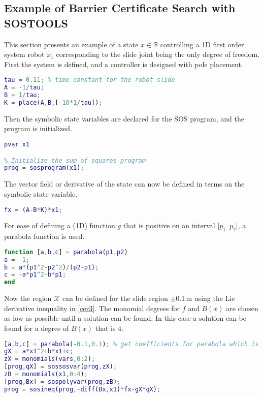 \subsection{Example of Barrier Certificate Search with SOSTOOLS}
This section presents an example of a state $x\in\mathbb{R}$ controlling a 1D first order system robot $x_1$ corresponding to the slide joint being the only degree of freedom. First the system is defined, and a controller is designed with pole placement.
\begin{lstlisting}[language=matlab]
% Define state-space system with x1 = robot position
tau = 0.11; % time constant for the robot slide
A = -1/tau;
B = 1/tau;
K = place(A,B,[-10*1/tau]);
\end{lstlisting}
Then the symbolic state variables are declared for the SOS program, and the program is initialized.
\begin{lstlisting}[language=matlab]
% Declare state variables
pvar x1

% Initialize the sum of squares program
prog = sosprogram(x1);
\end{lstlisting}
The vector field or derivative of the state can now be defined in terms on the symbolic state variable.
\begin{lstlisting}[language=matlab]
% Vector field dx/dt = fx (closed loop)
fx = (A-B*K)*x1;
\end{lstlisting}
For ease of defining a (1D) function $g$ that is positive on an interval [$p_1\,\,\, p_2$], a parabola function is used.
\begin{lstlisting}[language=matlab]
function [a,b,c] = parabola(p1,p2)
a = -1;
b = a*(p1^2-p2^2)/(p2-p1);
c = -a*p1^2-b*p1;
end
\end{lstlisting}
Now the region $\mathcal{X}$ can be defined for the slide region $\pm0.1$\,m using the Lie derivative inequality in \autoref{cer3}. The monomial degrees for $f$ and $B(x)$ are chosen as low as possible until a solution can be found. In this case a solution can be found for a degree of $B(x)$ that is 4.
\begin{lstlisting}[language=matlab]
% Define space X in R^n
[a,b,c] = parabola(-0.1,0.1); % get coefficients for parabola which is positive for x in [-0.1,0.1]
gX = a*x1^2+b*x1+c;
zX = monomials(vars,0:2);
[prog,qX] = sossosvar(prog,zX);
zB = monomials(x1,0:4);
[prog,Bx] = sospolyvar(prog,zB);
prog = sosineq(prog,-diff(Bx,x1)*fx-gX*qX);
\end{lstlisting}
